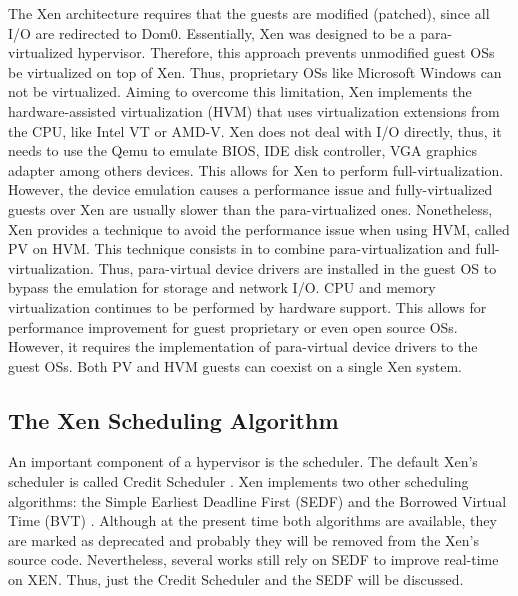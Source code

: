 The Xen architecture requires that the guests are modified (patched), since all I/O are redirected to Dom0. Essentially, Xen was designed to be a para-virtualized hypervisor. Therefore, this approach prevents  unmodified guest OSs be virtualized on top of Xen. Thus, proprietary OSs like Microsoft Windows can not be virtualized. Aiming to overcome this limitation, Xen implements the hardware-assisted virtualization (HVM) that uses virtualization extensions from the CPU, like Intel VT or AMD-V. Xen does not deal with I/O directly, thus, it needs to use the Qemu \cite{qemu} to emulate BIOS, IDE disk controller, VGA graphics adapter among others devices. This allows for Xen to perform full-virtualization. However, the device emulation causes a performance issue and fully-virtualized guests over Xen are usually slower than the para-virtualized ones. Nonetheless, Xen provides a technique to avoid the performance issue when using HVM, called PV on HVM. This technique consists in to combine para-virtualization and full-virtualization. Thus, para-virtual device drivers are installed in the guest OS to bypass the emulation for storage and network I/O. CPU and memory virtualization continues to be performed by hardware support. This allows for performance improvement for guest proprietary or even open source OSs. However, it requires the implementation of para-virtual device drivers to the guest OSs. Both PV and HVM guests can coexist on a single Xen system.

\subsection{The Xen Scheduling Algorithm}
\label{subsubsection:xensch}

An important component of a hypervisor is the scheduler. The default Xen's scheduler is called Credit Scheduler \cite{Ding2014}. Xen implements two other scheduling algorithms: the Simple Earliest Deadline First (SEDF) \cite{sedf} and the Borrowed Virtual Time (BVT) \cite{Duda:1999}. Although at the present time both algorithms are available, they are marked as deprecated and probably they will be removed from the Xen's source code. Nevertheless, several works still rely on SEDF to improve real-time on XEN. Thus, just the Credit Scheduler and the SEDF will be discussed. 


